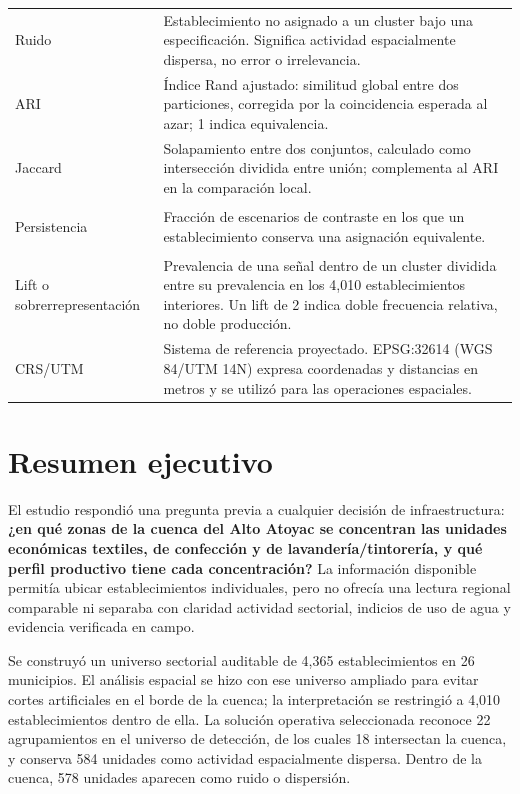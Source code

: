 \documentclass[11pt,letterpaper]{article}
\begin{document}
\begin{longtable}{>{\bfseries\raggedright\arraybackslash}p{}>{\raggedright\arraybackslash}p{}}
Ruido & Establecimiento no asignado a un cluster bajo una especificación. Significa actividad espacialmente dispersa, no error o irrelevancia. \\
ARI & Índice Rand ajustado: similitud global entre dos particiones, corregida por la coincidencia esperada al azar; 1 indica equivalencia. \\
Jaccard & Solapamiento entre dos conjuntos, calculado como intersección dividida entre unión; complementa al ARI en la comparación local. \\
Persistencia & Fracción de escenarios de contraste en los que un establecimiento conserva una asignación equivalente. \\
Lift o sobrerrepresentación & Prevalencia de una señal dentro de un cluster dividida entre su prevalencia en los 4,010 establecimientos interiores. Un lift de 2 indica doble frecuencia relativa, no doble producción. \\
CRS/UTM & Sistema de referencia proyectado. EPSG:32614 (WGS 84/UTM 14N) expresa coordenadas y distancias en metros y se utilizó para las operaciones espaciales. \\
\bottomrule
\end{longtable}
\normalsize

\newpage
\tableofcontents
\newpage

\section{Resumen ejecutivo}

El estudio respondió una pregunta previa a cualquier decisión de infraestructura: \textbf{¿en qué zonas de la cuenca del Alto Atoyac se concentran las unidades económicas textiles, de confección y de lavandería/tintorería, y qué perfil productivo tiene cada concentración?} La información disponible permitía ubicar establecimientos individuales, pero no ofrecía una lectura regional comparable ni separaba con claridad actividad sectorial, indicios de uso de agua y evidencia verificada en campo.

Se construyó un universo sectorial auditable de 4,365 establecimientos en 26 municipios. El análisis espacial se hizo con ese universo ampliado para evitar cortes artificiales en el borde de la cuenca; la interpretación se restringió a 4,010 establecimientos dentro de ella. La solución operativa seleccionada reconoce 22 agrupamientos en el universo de detección, de los cuales 18 intersectan la cuenca, y conserva 584 unidades como actividad espacialmente dispersa. Dentro de la cuenca, 578 unidades aparecen como ruido o dispersión.
\end{document}
